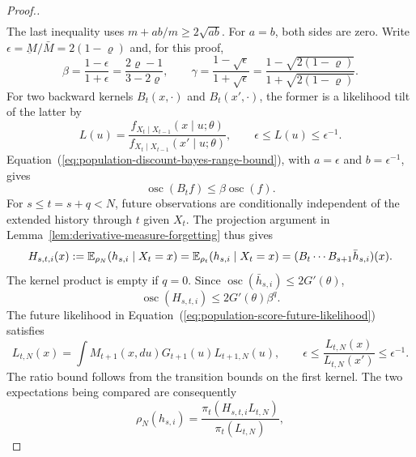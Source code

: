 \documentclass[11pt]{article}
\theoremstyle{thmstylethree}%
\begin{document}
{\begin{proof}[Proof.]
\begin{align}
\end{align}
The last inequality uses $m+ab/m\geq2\sqrt{ab}$. For $a=b$, both
sides are zero.
\endgraf
Write $\epsilon=\underbar M/\bar M=2(1-\varrho)$ and, for this proof,
\begin{equation}
\beta=\frac{1-\epsilon}{1+\epsilon}
=\frac{2\varrho-1}{3-2\varrho},
\qquad
\gamma=\frac{1-\sqrt\epsilon}{1+\sqrt\epsilon}
=\frac{1-\sqrt{2(1-\varrho)}}{1+\sqrt{2(1-\varrho)}}.
\end{equation}
For two backward kernels $B_t(x,\cdot)$ and $B_t(x',\cdot)$,
the former is a likelihood tilt of the latter by
\begin{equation}
L(u)=\frac{f_{X_t\mid X_{t-1}}(x\mid u;\theta)}
{f_{X_t\mid X_{t-1}}(x'\mid u;\theta)},
\qquad \epsilon\leq L(u)\leq\epsilon^{-1}.
\end{equation}
Equation~(\ref{eq:population-discount-bayes-range-bound}), with
$a=\epsilon$ and $b=\epsilon^{-1}$, gives
\begin{equation}
\operatorname{osc}(B_tf)\leq\beta\operatorname{osc}(f).
\label{eq:population-discount-sharp-backward-contraction}
\end{equation}
For $s\leq t=s+q<N$, future observations are conditionally independent
of the extended history through $t$ given $X_t$. The projection argument
in Lemma~\ref{lem:derivative-measure-forgetting} thus gives
\begin{equation}
H_{s,t,i}(x):=\mathbb{E}_{\rho_N}(h_{s,i}\mid X_t=x)
=\mathbb{E}_{\rho_t}(h_{s,i}\mid X_t=x)
=(B_t\cdots B_{s+1}\bar h_{s,i})(x).
\label{eq:population-discount-common-conditional-past}
\end{equation}
The kernel product is empty if $q=0$. Since
$\operatorname{osc}(\bar h_{s,i})\leq2G'(\theta)$,
\begin{equation}
\operatorname{osc}(H_{s,t,i})\leq2G'(\theta)\beta^q.
\label{eq:population-discount-partial-smoother-oscillation}
\end{equation}
The future likelihood in Equation~(\ref{eq:population-score-future-likelihood})
satisfies
\begin{equation}
L_{t,N}(x)=\int M_{t+1}(x,du)G_{t+1}(u)L_{t+1,N}(u),
\qquad \epsilon\leq\frac{L_{t,N}(x)}{L_{t,N}(x')}\leq\epsilon^{-1}.
\label{eq:population-discount-future-likelihood-ratio}
\end{equation}
The ratio bound follows from the transition bounds on the first kernel.
The two expectations being compared are consequently
\begin{equation}
\rho_N(h_{s,i})=\frac{\pi_t(H_{s,t,i}L_{t,N})}{\pi_t(L_{t,N})},

\end{equation}
\end{proof}}
\end{document}
